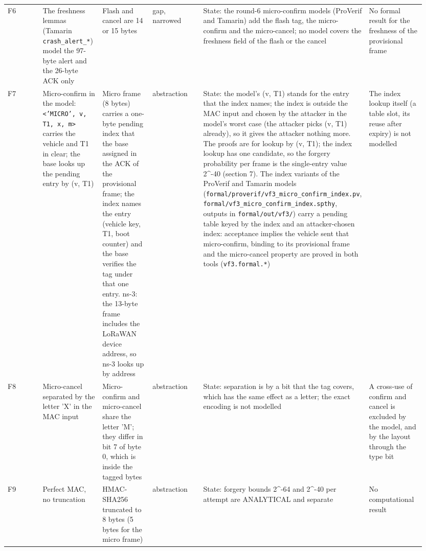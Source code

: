 {\begin{longtable}{p{0.158\linewidth}p{0.158\linewidth}p{0.158\linewidth}p{0.158\linewidth}p{0.158\linewidth}p{0.158\linewidth}}
F6 & The freshness lemmas (Tamarin \texttt{crash\_alert\_*}) model the 97-byte alert and the 26-byte ACK only & Flash and cancel are 14 or 15 bytes & gap, narrowed & State: the round-6 micro-confirm models (ProVerif and Tamarin) add the flash tag, the micro-confirm and the micro-cancel; no model covers the freshness field of the flash or the cancel & No formal result for the freshness of the provisional frame \\
F7 & Micro-confirm in the model: \texttt{<'MICRO', v, T1, x, m>} carries the vehicle and T1 in clear; the base looks up the pending entry by (v, T1) & Micro frame (8 bytes) carries a one-byte pending index that the base assigned in the ACK of the provisional frame; the index names the entry (vehicle key, T1, boot counter) and the base verifies the tag under that one entry. ns-3: the 13-byte frame includes the LoRaWAN device address, so ns-3 looks up by address & abstraction & State: the model's (v, T1) stands for the entry that the index names; the index is outside the MAC input and chosen by the attacker in the model's worst case (the attacker picks (v, T1) already), so it gives the attacker nothing more. The proofs are for lookup by (v, T1); the index lookup has one candidate, so the forgery probability per frame is the single-entry value 2\textasciicircum{}-40 (section 7). The index variants of the ProVerif and Tamarin models (\texttt{formal/proverif/vf3\_micro\_confirm\_index.pv}, \texttt{formal/vf3\_micro\_confirm\_index.spthy}, outputs in \texttt{formal/out/vf3/}) carry a pending table keyed by the index and an attacker-chosen index: acceptance implies the vehicle sent that micro-confirm, binding to its provisional frame and the micro-cancel property are proved in both tools (\texttt{vf3.formal.*}) & The index lookup itself (a table slot, its reuse after expiry) is not modelled \\
F8 & Micro-cancel separated by the letter 'X' in the MAC input & Micro-confirm and micro-cancel share the letter 'M'; they differ in bit 7 of byte 0, which is inside the tagged bytes & abstraction & State: separation is by a bit that the tag covers, which has the same effect as a letter; the exact encoding is not modelled & A cross-use of confirm and cancel is excluded by the model, and by the layout through the type bit \\
F9 & Perfect MAC, no truncation & HMAC-SHA256 truncated to 8 bytes (5 bytes for the micro frame) & abstraction & State: forgery bounds 2\textasciicircum{}-64 and 2\textasciicircum{}-40 per attempt are ANALYTICAL and separate & No computational result \\

\end{longtable}}
